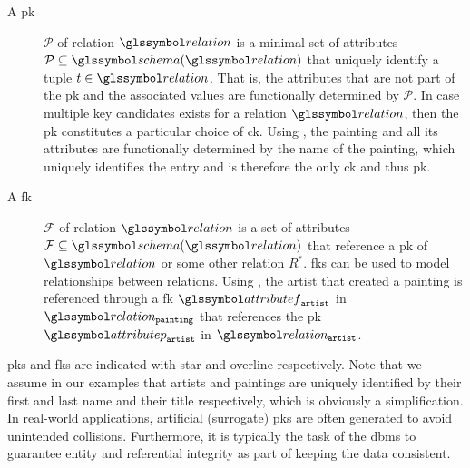 \begin{description}
    \item[A \acrfull{pk}] $\mathcal{P}$ of relation $\relation$ is a minimal set of attributes $\mathcal{P} \subseteq \schema(\relation)$ that uniquely identify a tuple $t \in \relation$. That is, the attributes that are not part of the \acrshort{pk} and the associated values are functionally determined by $\mathcal{P}$. In case multiple key candidates exists for a relation $\relation$, then the \acrshort{pk} constitutes a particular choice of \acrfull{ck}. Using , the painting and all its attributes are functionally determined by the name of the painting, which uniquely identifies the entry and is therefore the only \acrshort{ck} and thus \acrshort{pk}.
 
    \item[A \acrfull{fk}] $\mathcal{F}$ of relation $\relation$ is a set of attributes $\mathcal{F} \subseteq \schema(\relation)$ that reference a \acrshort{pk} of $\relation$ or some other relation $R^{*}$. \acrshort{fk}s can be used to model relationships between relations. Using , the artist that created a painting is referenced through a \acrshort{fk} $\attributef_{\mathtt{artist}}$ in $\relation_{\mathtt{painting}}$ that references the \acrshort{pk} $\attributep_{\mathtt{artist}}$ in $\relation_{\mathtt{artist}}$.
\end{description}

\acrshort{pk}s and \acrshort{fk}s are indicated with star and overline respectively. Note that we assume in our examples that artists and paintings are uniquely identified by their first and last name and their title respectively, which is obviously a simplification. In real-world applications, artificial (surrogate) \acrshort{pk}s are often generated to avoid unintended collisions. Furthermore, it is typically the task of the \acrshort{dbms} to guarantee entity and referential integrity as part of keeping the data consistent.

